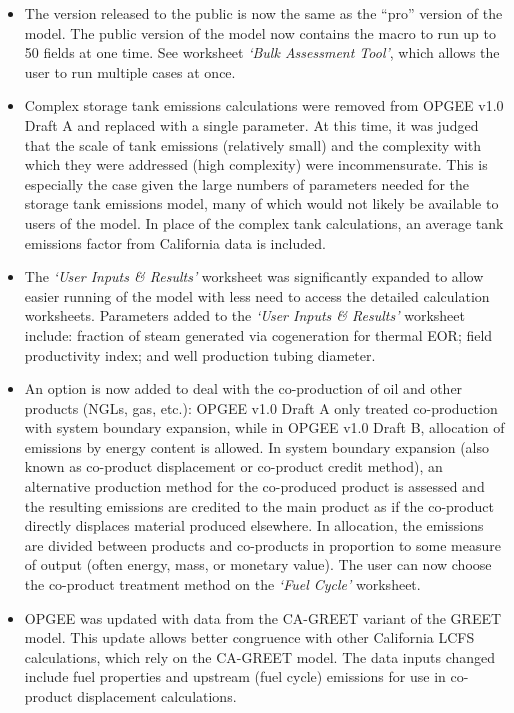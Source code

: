 \documentclass[11pt]{report}
\newcommand{\sheet}[1]{\textit{`{#1}'}}
\begin{document}
\begin{itemize}

\item The version released to the public is now the same as the ``pro'' version of the model. The public version of the model now contains the macro to run up to 50 fields at one time. See worksheet \sheet{Bulk Assessment Tool}, which allows the user to run multiple cases at once.

\item Complex storage tank emissions calculations were removed from OPGEE v1.0 Draft A and replaced with a single parameter. At this time, it was judged that the scale of tank emissions (relatively small) and the complexity with which they were addressed (high complexity) were incommensurate. This is especially the case given the large numbers of parameters needed for the storage tank emissions model, many of which would not likely be available to users of the model. In place of the complex tank calculations, an average tank emissions factor from California data is included.

\item The \sheet{User Inputs \& Results} worksheet was significantly expanded to allow easier running of the model with less need to access the detailed calculation worksheets. Parameters added to the \sheet{User Inputs \& Results} worksheet include: fraction of steam generated via cogeneration for thermal EOR; field productivity index; and well production tubing diameter.

\item An option is now added to deal with the co-production of oil and other products (NGLs, gas, etc.): OPGEE v1.0 Draft A only treated co-production with system boundary expansion, while in OPGEE v1.0 Draft B, allocation of emissions by energy content is allowed. In system boundary expansion (also known as co-product displacement or co-product credit method), an alternative production method for the co-produced product is assessed and the resulting emissions are credited to the main product as if the co-product directly displaces material produced elsewhere. In allocation, the emissions are divided between products and co-products in proportion to some measure of output (often energy, mass, or monetary value). The user can now choose the co-product treatment method on the \sheet{Fuel Cycle} worksheet. 

\item OPGEE was updated with data from the CA-GREET variant of the GREET model. This update allows better congruence with other California LCFS calculations, which rely on the CA-GREET model. The data inputs changed include fuel properties and upstream (fuel cycle) emissions for use in co-product displacement calculations.


\end{itemize}
\end{document}
